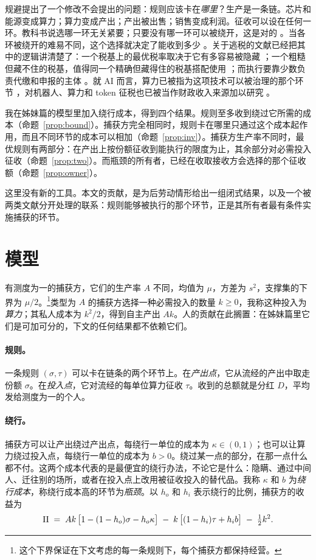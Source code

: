 规避提出了一个修改不会提出的问题：规则应该卡在\emph{哪里}？生产是一条链。芯片和能源变成算力；算力变成产出；产出被出售；销售变成利润。征收可以设在任何一环。教科书说选哪一环无关紧要；只要没有哪一环可以被绕开，这是对的 \citep{Slemrod2008}。当各环被绕开的难易不同，这个选择就决定了能收到多少 \citep{KopczukEtAl2016}。关于逃税的文献已经把其中的逻辑讲清楚了：一个税基上的最优税率取决于它有多容易被隐藏 \citep{CremerGahvari1993}；一个粗糙但藏不住的税基，值得同一个精确但藏得住的税基搭配使用
\citep{BoadwayMarchandPestieau1994,BestEtAl2015}；而执行要靠少数负责代缴和申报的主体
\citep{KopczukSlemrod2006,KlevenKreinerSaez2016}。就 AI 而言，算力已被指为这项技术可以被治理的那个环节 \citep{SastryEtAl2024}，对机器人、算力和 token 征税也已被当作财政收入来源加以研究 \citep{GuerreiroRebeloTeles2022,KorinekLockwood2026}。

我在姊妹篇的模型里加入绕行成本，得到四个结果。规则至多收到绕过它所需的成本（命题~\ref{prop:bound}）。捕获方完全相同时，规则卡在哪里只通过这个成本起作用，而且不同环节的成本可以相加（命题~\ref{prop:inv}）。捕获方生产率不同时，最优规则有两部分：在产出上按份额征收到能执行的限度为止，其余部分对必需投入征收（命题~\ref{prop:two}）。而瓶颈的所有者，已经在收取接收方会选择的那个征收额（命题~\ref{prop:owner}）。

这里没有新的工具。本文的贡献，是为后劳动情形给出一组闭式结果，以及一个被两类文献分开处理的联系：规则能够被执行的那个环节，正是其所有者最有条件实施捕获的环节。

\section{模型}

有测度为一的捕获方，它们的生产率 $A$ 不同，均值为 $\mu$，方差为 $s^2$，支撑集的下界为
$\mu/2$。\footnote{这个下界保证在下文考虑的每一条规则下，每个捕获方都保持经营。}类型为 $A$
的捕获方选择一种必需投入的数量 $k\ge 0$，我称这种投入为\emph{算力}；其私人成本为
$k^2/2$，得到自主产出 $Ak$。人的贡献在此搁置：在姊妹篇里它们是可加可分的，下文的任何结果都不依赖它们。

\paragraph{规则。} 一条规则 $(\sigma,\tau)$ 可以卡在链条的两个环节上。在\emph{产出点}，它从流经的产出中取走份额 $\sigma$。在\emph{投入点}，它对流经的每单位算力征收 $\tau$。收到的总额就是分红 $D$，平均发给测度为一的个人。

\paragraph{绕行。} 捕获方可以让产出绕过产出点，每绕行一单位的成本为 $\kappa\in(0,1)$；也可以让算力绕过投入点，每绕行一单位的成本为 $b>0$。绕过某一点的部分，在那一点什么都不付。这两个成本代表的是最便宜的绕行办法，不论它是什么：隐瞒、通过中间人、迁往别的场所，或者在投入点上改用被征收投入的替代品。我称 $\kappa$ 和 $b$ 为\emph{绕行成本}，称绕行成本高的环节为\emph{瓶颈}。以 $h_o$ 和 $h_i$ 表示绕行的比例，捕获方的收益为
\begin{equation}
  \Pi \;=\; Ak\,\bigl[1-(1-h_o)\sigma-h_o\kappa\bigr]
        \;-\;k\,\bigl[(1-h_i)\tau+h_i b\bigr]\;-\;\tfrac{1}{2} k^2 .
\end{equation}

